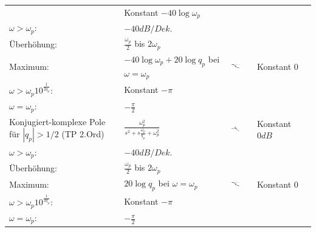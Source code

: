 \begin{landscape}
\begin{longtable}{|p{5cm}|l|ll|ll|}
\begin{tabular}{ll}
			$\omega < \omega_p$: 	& Konstant $-40 \log \omega_p$ \\
			$\omega > \omega_p$:	& $-40dB/Dek.$ \\
			Überhöhung: 			& $\frac{\omega_p}{2}$ bis $2\omega_p$ \\
			Maximum:				& $-40\log\omega_p + 20 \log q_p$ bei $\omega = \omega_p$			
		\end{tabular} &
		\parbox[c][1cm]{1cm}{\includegraphics[width=1cm]{Images/bode-approx-phase-6.png}} &
		\begin{tabular}{ll}
			$\omega < \frac{\omega_p}{10^{\frac{1}{2q_p}}}$:	& Konstant $0$ \\
			$\omega > \omega_p 10^{\frac{1}{2q_p}}$:			& Konstant $-\pi$ \\
			$\omega = \omega_p$:								& $-\frac{\pi}{2}$
		\end{tabular}
		\\ \hline
		Konjugiert-komplexe Pole \newline
		für $|q_p| > 1/2$ (TP 2.Ord)&
		$\frac{\omega_p^2}{s^2+s\frac{\omega_p}{q_p}+\omega_p^2}$ & 
		\parbox[c][1cm]{1cm}{\includegraphics[width=1cm]{Images/bode-approx-ampl-6.png}} &
		\begin{tabular}{ll}
			$\omega < \omega_p$:	& Konstant $0dB$ \\
			$\omega > \omega_p$:	& $-40dB/Dek.$ \\
			Überhöhung:				& $\frac{\omega_p}{2}$ bis $2 \omega_p$ \\
			Maximum:				& $20 \log q_p$ bei $\omega = \omega_p$
		\end{tabular} &
		\parbox[c][1cm]{1cm}{\includegraphics[width=1cm]{Images/bode-approx-phase-6.png}}	& 
		\begin{tabular}{ll}
			$\omega < \frac{\omega_p}{10^{\frac{1}{2q_p}}}$:	& Konstant $0$ \\
			$\omega > \omega_p 10^{\frac{1}{2q_p}}$:			& Konstant $-\pi$ \\
			$\omega = \omega_p$:								& $-\frac{\pi}{2}$
		\end{tabular}
		\\ \hline	

\end{longtable}
\end{landscape}
